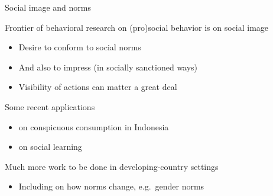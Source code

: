 \documentclass[aspectratio=169, 10pt, handout]{beamer}
\newenvironment{wideitemize}{\itemize\addtolength{\itemsep}{10pt}}{\enditemize}
\begin{document}
\begin{frame}{Social image and norms}

\begin{wideitemize}

	\item Frontier of behavioral research on (pro)social behavior is on social image

	\begin{itemize}
	
		\item Desire to conform to social norms
		
		\item And also to impress (in socially sanctioned ways)

		\item Visibility of actions can matter a great deal

	\end{itemize}

	\item Some recent applications

	\begin{itemize}
	
		\item \citet{platinum} on conspicuous consumption in Indonesia

		\item \cite{Chandrasekhar2018,Chandrasekhar2015,banerjee2018}
		on social learning

	\end{itemize}

	\item Much more work to be done in developing-country settings

	\begin{itemize}

		\item Including on how norms change, e.g.\ gender norms

	\end{itemize}
	
\end{wideitemize}


\end{frame}
\end{document}
